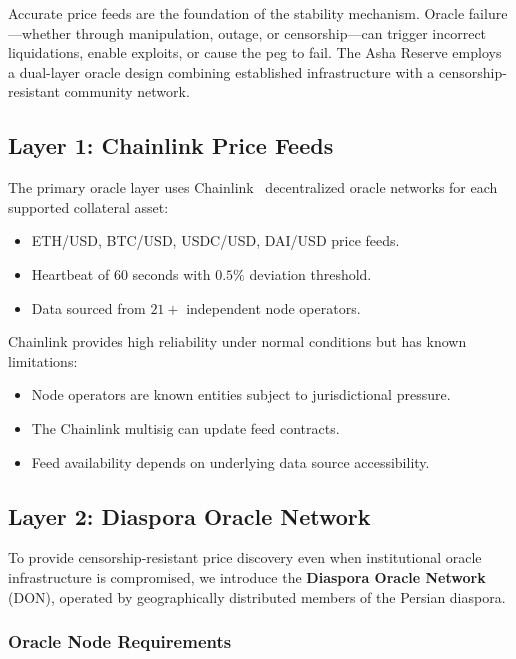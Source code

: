\documentclass[11pt,a4paper]{article}
\begin{document}
Accurate price feeds are the foundation of the stability mechanism.
Oracle failure---whether through manipulation, outage, or censorship---can trigger incorrect liquidations, enable exploits, or cause the peg to fail.
The Asha Reserve employs a dual-layer oracle design combining established infrastructure with a censorship-resistant community network.

\subsection{Layer 1: Chainlink Price Feeds}

The primary oracle layer uses Chainlink~\citep{chainlink2021} decentralized oracle networks for each supported collateral asset:

\begin{itemize}
  \item ETH/USD, BTC/USD, USDC/USD, DAI/USD price feeds.
  \item Heartbeat of $60$ seconds with $0.5\%$ deviation threshold.
  \item Data sourced from $21+$ independent node operators.
\end{itemize}

Chainlink provides high reliability under normal conditions but has known limitations:
\begin{itemize}
  \item Node operators are known entities subject to jurisdictional pressure.
  \item The Chainlink multisig can update feed contracts.
  \item Feed availability depends on underlying data source accessibility.
\end{itemize}

\subsection{Layer 2: Diaspora Oracle Network}

To provide censorship-resistant price discovery even when institutional oracle infrastructure is compromised, we introduce the \textbf{Diaspora Oracle Network} (DON), operated by geographically distributed members of the Persian diaspora.

\subsubsection{Oracle Node Requirements}
\end{document}
